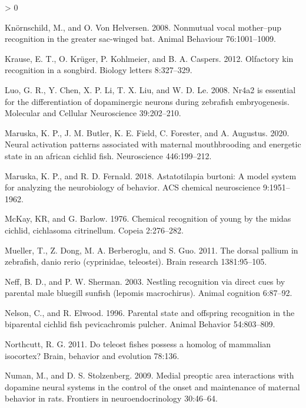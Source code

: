 \documentclass[
  12pt,
]{article}
\newlength{\cslhangindent}
\newenvironment{CSLReferences}[2] %
 {%
  \setlength{\parindent}{0pt}
  \ifodd #1 \everypar{\setlength{\hangindent}{\cslhangindent}}\ignorespaces\fi
  \ifnum #2 > 0
  \setlength{\parskip}{#2\baselineskip}
  \fi
 }%
 {}
\begin{document}
\begin{CSLReferences}{1}{0}
\leavevmode\hypertarget{ref-RN7}{}%
Knörnschild, M., and O. Von Helversen. 2008. Nonmutual vocal mother--pup recognition in the greater sac-winged bat. Animal Behaviour 76:1001--1009.

\leavevmode\hypertarget{ref-RN4}{}%
Krause, E. T., O. Krüger, P. Kohlmeier, and B. A. Caspers. 2012. Olfactory kin recognition in a songbird. Biology letters 8:327--329.

\leavevmode\hypertarget{ref-RN34}{}%
Luo, G. R., Y. Chen, X. P. Li, T. X. Liu, and W. D. Le. 2008. Nr4a2 is essential for the differentiation of dopaminergic neurons during zebrafish embryogenesis. Molecular and Cellular Neuroscience 39:202--210.

\leavevmode\hypertarget{ref-RN18}{}%
Maruska, K. P., J. M. Butler, K. E. Field, C. Forester, and A. Augustus. 2020. Neural activation patterns associated with maternal mouthbrooding and energetic state in an african cichlid fish. Neuroscience 446:199--212.

\leavevmode\hypertarget{ref-RN14}{}%
Maruska, K. P., and R. D. Fernald. 2018. Astatotilapia burtoni: A model system for analyzing the neurobiology of behavior. ACS chemical neuroscience 9:1951--1962.

\leavevmode\hypertarget{ref-RN29}{}%
McKay, KR, and G. Barlow. 1976. Chemical recognition of young by the midas cichlid, cichlasoma citrinellum. Copeia 2:276--282.

\leavevmode\hypertarget{ref-RN31}{}%
Mueller, T., Z. Dong, M. A. Berberoglu, and S. Guo. 2011. The dorsal pallium in zebrafish, danio rerio (cyprinidae, teleostei). Brain research 1381:95--105.

\leavevmode\hypertarget{ref-RN9}{}%
Neff, B. D., and P. W. Sherman. 2003. Nestling recognition via direct cues by parental male bluegill sunfish (lepomis macrochirus). Animal cognition 6:87--92.

\leavevmode\hypertarget{ref-RN28}{}%
Nelson, C., and R. Elwood. 1996. Parental state and offspring recognition in the biparental cichlid fish pevicachromis pulcher. Animal Behavior 54:803--809.

\leavevmode\hypertarget{ref-RN32}{}%
Northcutt, R. G. 2011. Do teleost fishes possess a homolog of mammalian isocortex? Brain, behavior and evolution 78:136.

\leavevmode\hypertarget{ref-RN22}{}%
Numan, M., and D. S. Stolzenberg. 2009. Medial preoptic area interactions with dopamine neural systems in the control of the onset and maintenance of maternal behavior in rats. Frontiers in neuroendocrinology 30:46--64.


\end{CSLReferences}
\end{document}
